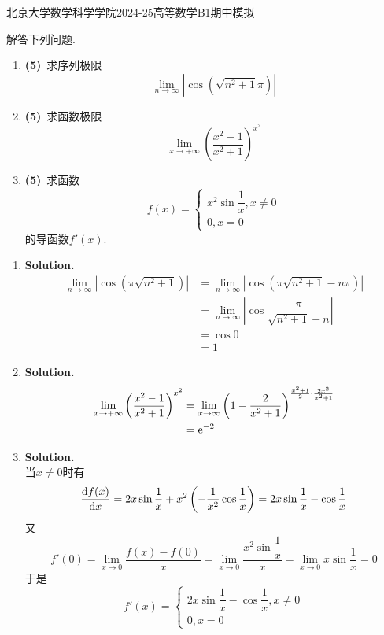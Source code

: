 \documentclass{ctexart}
\begin{document}
\pagestyle{empty}
\begin{center}\Large
    北京大学数学科学学院2024-25高等数学B1期中模拟
\end{center}
\begin{problem}[1.(15\songti 分)]
    解答下列问题.
    \begin{enumerate}[label=\textbf{(\arabic*)}]
        \item \textbf{(5)}\ 求序列极限$$\lim_{n\to\infty}\left|\cos\left(\sqrt{n^2+1}\pi\right)\right|$$
        \item \textbf{(5)}\ 求函数极限$$\lim_{x\to+\infty}\left(\dfrac{x^2-1}{x^2+1}\right)^{x^2}$$
        \item \textbf{(5)}\ 求函数$$f(x)=\left\{\begin{array}{l}x^2\sin\dfrac{1}{x},x\neq 0\\0,x=0\end{array}\right.$$的导函数$f'(x)$.
    \end{enumerate}
\end{problem}
\begin{solution}
    \begin{enumerate}[label=\textbf{(\arabic*)}]
        \item \textbf{Solution.}
            $$\begin{aligned}
                \lim_{n\to\infty}\left|\cos\left(\pi\sqrt{n^2+1}\right)\right|
                &= \lim_{n\to\infty}\left|\cos\left(\pi\sqrt{n^2+1}-n\pi\right)\right| \\
                &= \lim_{n\to\infty}\left|\cos\dfrac{\pi}{\sqrt{n^2+1}+n}\right| \\
                &= \cos 0 \\
                &= 1
            \end{aligned}$$
        \item \textbf{Solution.}
            $$\begin{aligned}
                \lim_{x\to+\infty}\left(\dfrac{x^2-1}{x^2+1}\right)^{x^2}
                &= \lim_{x\to\infty}\left(1-\dfrac{2}{x^2+1}\right)^{\frac{x^2+1}{2}\cdot\frac{2x^2}{x^2+1}} \\
                &= \mathrm{e}^{-2}
            \end{aligned}$$
        \item \textbf{Solution.}\\
            当$x\neq0$时有
            $$\dfrac{\mathrm{d} f(x)}{\mathrm{d} x}=2x\sin\dfrac{1}{x}+x^2\left(-\dfrac{1}{x^2}\cos\dfrac{1}{x}\right)=2x\sin\dfrac{1}{x}-\cos\dfrac{1}{x}$$
            又$$f'(0)=\lim_{x\to0}\dfrac{f(x)-f(0)}{x}=\lim_{x\to0}\dfrac{x^2\sin\dfrac{1}{x}}{x}=\lim_{x\to0}x\sin\dfrac{1}{x}=0$$
            于是$$f'(x)=\left\{\begin{array}{l}
                2x\sin\dfrac{1}{x}-\cos\dfrac{1}{x},x\neq0\\0,x=0
            \end{array}\right.$$
    \end{enumerate}
\end{solution}
\end{document}
